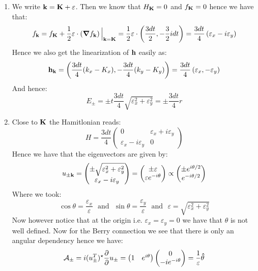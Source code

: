 \documentclass[10pt,a4paper]{article}
\begin{document}
\begin{enumerate}
\item We write $\vb{k} = \vb{K} + \vb{\varepsilon}$. Then we know that $H_{\vb{K}} = 0$ and $f_{\vb{K}} = 0$ hence we have that:
\[
f_{\vb{k}} = f_{\vb{K}}  + \frac{1}{2}\vb{\varepsilon} \cdot \left(\grad f_{\vb{k}} \right) \Big|_{\vb{k} = \vb{K}} = \frac{1}{2} \vb{\varepsilon} \cdot \left( \frac{3 d t}{2}, - \frac{3}{2} i d t  \right) = \frac{3dt}{4}\left( \varepsilon_x - i \varepsilon_y \right)
\] 
Hence we also get the linearization of $\vb{h}$ easily as:
\[
\vb{h}_{\vb{k}} = \left(\frac{3dt}{4} (k_x - K_x), -\frac{3 dt}{4} (k_y - K_y)\right)  = \frac{3 dt}{4}\left(\varepsilon_x, - \varepsilon_y \right)
\]
And hence:
\[
E_\pm = \pm t \frac{3 dt}{4} \sqrt{\varepsilon_x^2 + \varepsilon_y^2} = \pm \frac{3 d t}{4} r 
\]

\item Close to $\vb{K}$ the Hamitlonian reads:
\[
H = \frac{3 d t}{4}\begin{pmatrix}
0 & \varepsilon_x + i \varepsilon_y\\
\varepsilon_x - i \varepsilon_y & 0 
\end{pmatrix}
\]
Hence we have that the eigenvectors are given by:
\[
u_{\pm \vb{k}} = \begin{pmatrix}
\pm \sqrt{\varepsilon_x^2 + \varepsilon_y^2}\\
\varepsilon_x - i \varepsilon_y
\end{pmatrix} = \begin{pmatrix}
\pm \varepsilon\\
\varepsilon e^{-i \theta}
\end{pmatrix} \propto \begin{pmatrix}
\pm e^{i \theta/2}\\
e^{-i\theta/2}
\end{pmatrix}
\]
Where we took:
\[
\cos \theta = \frac{\varepsilon_x}{\varepsilon} \mbox{~~and~~} \sin \theta = \frac{\varepsilon_y}{\varepsilon} \mbox{~~and~~} \varepsilon = \sqrt{\varepsilon_x^2 + \varepsilon_y^2}
\]
Now however notice that at the origin i.e. $\varepsilon_x = \varepsilon_y = 0$ we have that $\theta$ is not well defined. Now for the Berry connection we see that there is only an angular dependency hence we have:
\[
\mathcal{A}_{\pm} = i (u_{\pm}^T)^\star \pdv{}{\vb{}} u_{\pm} = \begin{pmatrix}
1 & e^{i\theta}
\end{pmatrix} \begin{pmatrix}
0\\
-i e^{-i \theta}
\end{pmatrix} =  \frac{1}{\varepsilon} \vu{\theta} 
\]


\end{enumerate}
\end{document}
